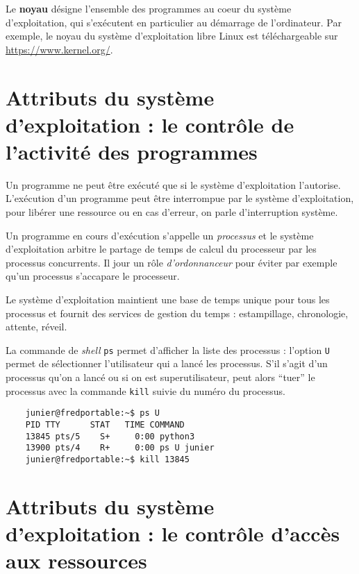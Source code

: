 \documentclass[
  11pt,
]{article}
\newcounter{cours}
\newcounter{prog}
\newcounter{logi}
\begin{document}
Le \textbf{noyau} désigne l'ensemble des programmes au coeur du système
d'exploitation, qui s'exécutent en particulier au démarrage de
l'ordinateur. Par exemple, le noyau du système d'exploitation libre
Linux est téléchargeable sur \url{https://www.kernel.org/}.

\hypertarget{attributs-du-systuxe8me-dexploitation-le-contruxf4le-de-lactivituxe9-des-programmes}{%
\section{Attributs du système d'exploitation : le contrôle de l'activité
des
programmes}\label{attributs-du-systuxe8me-dexploitation-le-contruxf4le-de-lactivituxe9-des-programmes}}

Un programme ne peut être exécuté que si le système d'exploitation
l'autorise. L'exécution d'un programme peut être interrompue par le
système d'exploitation, pour libérer une ressource ou en cas d'erreur,
on parle d'interruption système.

Un programme en cours d'exécution s'appelle un \emph{processus} et le
système d'exploitation arbitre le partage de temps de calcul du
processeur par les processus concurrents. Il jour un rôle
\emph{d'ordonnanceur} pour éviter par exemple qu'un processus s'accapare
le processeur.

Le système d'exploitation maintient une base de temps unique pour tous
les processus et fournit des services de gestion du temps :
estampillage, chronologie, attente, réveil.

La commande de \emph{shell} \texttt{ps} permet d'afficher la liste des
processus : l'option \texttt{U} permet de sélectionner l'utilisateur qui
a lancé les processus. S'il s'agit d'un processus qu'on a lancé ou si on
est superutilisateur, peut alors ``tuer'' le processus avec la commande
\texttt{kill} suivie du numéro du processus.

\begin{verbatim}
    junier@fredportable:~$ ps U
    PID TTY      STAT   TIME COMMAND
    13845 pts/5    S+     0:00 python3
    13900 pts/4    R+     0:00 ps U junier
    junier@fredportable:~$ kill 13845
\end{verbatim}

\hypertarget{attributs-du-systuxe8me-dexploitation-le-contruxf4le-daccuxe8s-aux-ressources}{%
\section{Attributs du système d'exploitation : le contrôle d'accès aux
ressources}\label{attributs-du-systuxe8me-dexploitation-le-contruxf4le-daccuxe8s-aux-ressources}}
\end{document}
